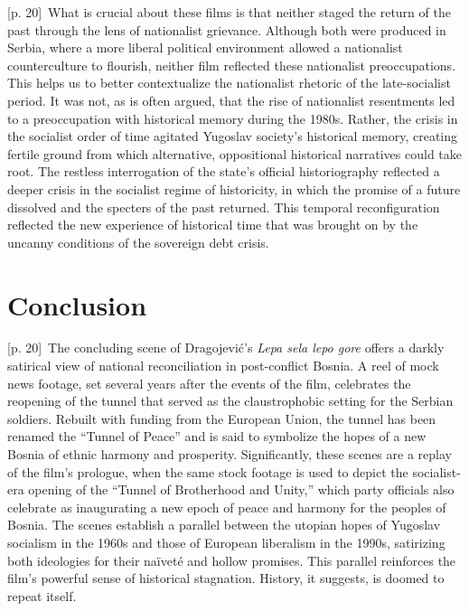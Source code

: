\documentclass[10pt,a4paper]{article}
\begin{document}
{\scriptsize\color{gray} [p. 20]}\ What is crucial about these films is that neither staged the return of the past through the lens of nationalist grievance. Although both were produced in Serbia, where a more liberal political environment allowed a nationalist counterculture to flourish, neither film reflected these nationalist preoccupations. This helps us to better contextualize the nationalist rhetoric of the late-socialist period. It was not, as is often argued, that the rise of nationalist resentments led to a preoccupation with historical memory during the 1980s. Rather, the crisis in the socialist order of time agitated Yugoslav society’s historical memory, creating fertile ground from which alternative, oppositional historical narratives could take root. The restless interrogation of the state’s official historiography reflected a deeper crisis in the socialist regime of historicity, in which the promise of a future dissolved and the specters of the past returned. This temporal reconfiguration reflected the new experience of historical time that was brought on by the uncanny conditions of the sovereign debt crisis.\par
{}\section*{Conclusion}
{\scriptsize\color{gray} [p. 20]}\ The concluding scene of Dragojević’s \textit{Lepa sela lepo gore} offers a darkly satirical view of national reconciliation in post-conflict Bosnia. A reel of mock news footage, set several years after the events of the film, celebrates the reopening of the tunnel that served as the claustrophobic setting for the Serbian soldiers. Rebuilt with funding from the European Union, the tunnel has been renamed the “Tunnel of Peace” and is said to symbolize the hopes of a new Bosnia of ethnic harmony and prosperity. Significantly, these scenes are a replay of the film’s prologue, when the same stock footage is used to depict the socialist-era opening of the “Tunnel of Brotherhood and Unity,” which party officials also celebrate as inaugurating a new epoch of peace and harmony for the peoples of Bosnia. The scenes establish a parallel between the utopian hopes of Yugoslav socialism in the 1960s and those of European liberalism in the 1990s, satirizing both ideologies for their naïveté and hollow promises. This parallel reinforces the film’s powerful sense of historical stagnation. History, it suggests, is doomed to repeat itself.\par
\end{document}
